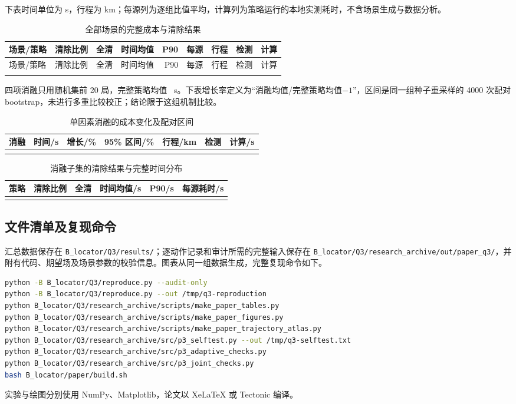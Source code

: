 下表时间单位为 s，行程为 km；每源列为逐组比值平均，计算列为策略运行的本地实测耗时，不含场景生成与数据分析。
\begingroup
\setlength{\tabcolsep}{3pt}
\begin{longtable}{@{}lrrrrrrrr@{}}
\caption{全部场景的完整成本与清除结果}\\
\toprule 场景/策略 & 清除比例 & 全清 & 时间均值 & P90 & 每源 & 行程 & 检测 & 计算\\\midrule\endfirsthead
\toprule 场景/策略 & 清除比例 & 全清 & 时间均值 & P90 & 每源 & 行程 & 检测 & 计算\\\midrule\endhead
\\
\bottomrule\end{longtable}
\endgroup
\newpage
四项消融只用随机集前 20 局，完整策略均值 \QThreeAblationBase\ s。下表增长率定义为“消融均值/完整策略均值$-1$”，区间是同一组种子重采样的 4000 次配对 bootstrap，未进行多重比较校正；结论限于这组机制比较。
\begin{table}[H]\centering
\caption{单因素消融的成本变化及配对区间}
\begin{tabular}{@{}lrrrrrr@{}}\toprule
消融 & 时间/s & 增长/\% & 95\% 区间/\% & 行程/km & 检测 & 计算/s\\\midrule
\\
\bottomrule\end{tabular}\end{table}
\begin{table}[H]\centering
\caption{消融子集的清除结果与完整时间分布}
\begin{tabular}{@{}lrrrrr@{}}\toprule
策略 & 清除比例 & 全清 & 时间均值/s & P90/s & 每源耗时/s\\\midrule
\\
\bottomrule\end{tabular}\end{table}

\subsection{文件清单及复现命令}
汇总数据保存在 \texttt{B\_locator/Q3/results/}；逐动作记录和审计所需的完整输入保存在
\texttt{B\_locator/Q3/research\_archive/out/paper\_q3/}，并附有代码、期望场及场景参数的校验信息。图表从同一组数据生成，完整复现命令如下。
\begin{lstlisting}[language=bash,caption={从仓库根目录复现问题三}]
python -B B_locator/Q3/reproduce.py --audit-only
python -B B_locator/Q3/reproduce.py --out /tmp/q3-reproduction
python B_locator/Q3/research_archive/scripts/make_paper_tables.py
python B_locator/Q3/research_archive/scripts/make_paper_figures.py
python B_locator/Q3/research_archive/scripts/make_paper_trajectory_atlas.py
python B_locator/Q3/research_archive/src/p3_selftest.py --out /tmp/q3-selftest.txt
python B_locator/Q3/research_archive/src/p3_adaptive_checks.py
python B_locator/Q3/research_archive/src/p3_joint_checks.py
bash B_locator/paper/build.sh
\end{lstlisting}
实验与绘图分别使用 NumPy、Matplotlib，论文以 XeLaTeX 或 Tectonic 编译。

